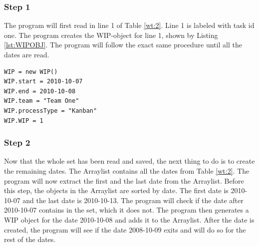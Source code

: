 \documentclass[UKenglish]{ifimaster}  %
\begin{document}
\subsubsection{Step 1}
The program will first read in line 1 of Table \ref{wt:2}.  Line 1 is labeled with task id one.  The program creates the WIP-object for line 1, shown by Listing \ref{lst:WIPOBJ}.  The program will follow the exact same procedure until all the dates are read. 

\begin{minipage}{\textwidth} 
\begin{lstlisting}[caption={Creating WIP-object},label={lst:WIPOBJ}]
WIP = new WIP()
WIP.start = 2010-10-07
WIP.end = 2010-10-08
WIP.team = "Team One"
WIP.processType = "Kanban"
WIP.WIP = 1
\end{lstlisting}
  \end{minipage}

 \subsubsection{Step 2}
\label{sub:sub:st}
Now that the whole set has been read and saved, the next thing to do is to create the remaining dates. The Arraylist contains all the dates from Table \ref{wt:2}.  The program will now extract the first and the last date from the Arraylist. Before this step, the objects in the Arraylist are sorted by date. The first date is 2010-10-07 and the last date is 2010-10-13.  The program will check if the date after 2010-10-07 contains in the set, which it does not. The program then generates a WIP object for the date 2010-10-08 and adds it to the Arraylist. %
After the date is created, the program will see if the date 2008-10-09 exits and will do so for the rest of the dates.

\end{document}
